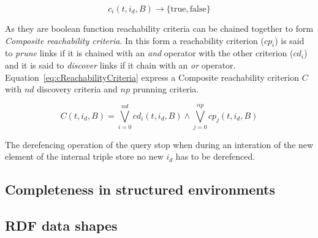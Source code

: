 \begin{equation}\label{eq:reachabilityCriteria}
c_i(t, i_d, B) \rightarrow \{\mathrm{true}, \mathrm{false}\}
\end{equation}

As they are boolean function reachability criteria can be chained together to form \emph{Composite reachability criteria}.
In this form a reachability criterion ($cp_i$) is said to \emph{prune} links if it is chained with an \emph{and} operator with the other criterion ($cd_i$) and it is said to \emph{discover} links if it chain with an \emph{or} operator.
Equation~\ref{eq:cReachabilityCriteria} express a Composite reachability criterion $C$ with $nd$ discovery criteria and $np$ prunning criteria.

\begin{equation}\label{eq:cReachabilityCriteria}
    C(t, i_d, B)  = \bigvee_{i=0}^{nd}cd_i(t, i_d, B) \land \bigvee_{j=0}^{np}cp_j(t, i_d, B)
\end{equation}

The derefencing operation of the query stop when during an interation of the new element of the internal triple store no new $i_d$ has to be derefenced.

\subsection{Completeness in structured environments}

\subsection{RDF data shapes}
